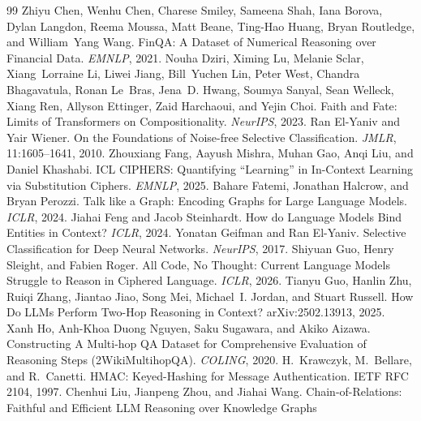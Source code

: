 \documentclass[10pt]{article} %
\begin{document}
\FloatBarrier
\begin{thebibliography}{99}
Zhiyu Chen, Wenhu Chen, Charese Smiley, Sameena Shah, Iana Borova, Dylan Langdon,
Reema Moussa, Matt Beane, Ting-Hao Huang, Bryan Routledge, and William~Yang Wang.
FinQA: A Dataset of Numerical Reasoning over Financial Data.
\emph{EMNLP}, 2021.
Nouha Dziri, Ximing Lu, Melanie Sclar, Xiang~Lorraine Li, Liwei Jiang,
Bill~Yuchen Lin, Peter West, Chandra Bhagavatula, Ronan Le~Bras,
Jena~D. Hwang, Soumya Sanyal, Sean Welleck, Xiang Ren, Allyson Ettinger,
Zaid Harchaoui, and Yejin Choi.
Faith and Fate: Limits of Transformers on Compositionality.
\emph{NeurIPS}, 2023.
Ran El-Yaniv and Yair Wiener.
On the Foundations of Noise-free Selective Classification.
\emph{JMLR}, 11:1605--1641, 2010.
Zhouxiang Fang, Aayush Mishra, Muhan Gao, Anqi Liu, and Daniel Khashabi.
ICL CIPHERS: Quantifying ``Learning'' in In-Context Learning via Substitution
Ciphers. \emph{EMNLP}, 2025.
Bahare Fatemi, Jonathan Halcrow, and Bryan Perozzi.
Talk like a Graph: Encoding Graphs for Large Language Models.
\emph{ICLR}, 2024.
Jiahai Feng and Jacob Steinhardt.
How do Language Models Bind Entities in Context?
\emph{ICLR}, 2024.
Yonatan Geifman and Ran El-Yaniv.
Selective Classification for Deep Neural Networks.
\emph{NeurIPS}, 2017.
Shiyuan Guo, Henry Sleight, and Fabien Roger.
All Code, No Thought: Current Language Models Struggle to Reason in Ciphered
Language. \emph{ICLR}, 2026.
Tianyu Guo, Hanlin Zhu, Ruiqi Zhang, Jiantao Jiao, Song Mei, Michael~I. Jordan,
and Stuart Russell.
How Do LLMs Perform Two-Hop Reasoning in Context?
arXiv:2502.13913, 2025.
Xanh Ho, Anh-Khoa Duong Nguyen, Saku Sugawara, and Akiko Aizawa.
Constructing A Multi-hop QA Dataset for Comprehensive Evaluation of
Reasoning Steps (2WikiMultihopQA). \emph{COLING}, 2020.
H.~Krawczyk, M.~Bellare, and R.~Canetti.
{HMAC}: Keyed-Hashing for Message Authentication.
{IETF RFC} 2104, 1997.
Chenhui Liu, Jianpeng Zhou, and Jiahai Wang.
Chain-of-Relations: Faithful and Efficient LLM Reasoning over Knowledge Graphs

\end{thebibliography}
\end{document}
